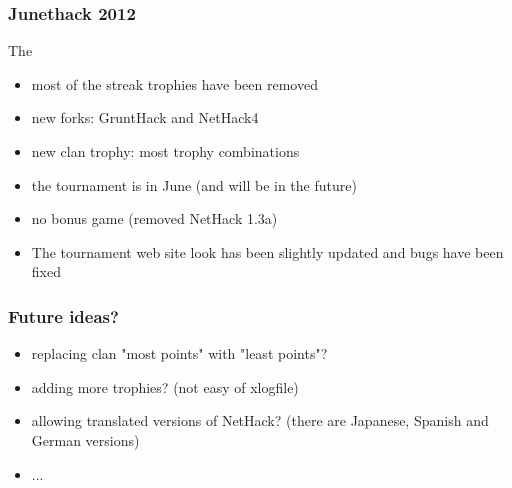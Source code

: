 \documentclass{beamer}
\begin{document}

\begin{frame}
\frametitle{Junethack 2012}
  The 
  \begin{itemize}[<+->]
    \item most of the streak trophies have been removed
    \item new forks: GruntHack and NetHack4
    \item new clan trophy: most trophy combinations
    \item the tournament is in June (and will be in the future)
    \item no bonus game (removed NetHack 1.3a)
    \item The tournament web site look has been slightly updated and bugs have been fixed
  \end{itemize}
\end{frame}

\begin{frame}
\frametitle{Future ideas?}
  \begin{itemize}[<+->]
    \item replacing clan "most points" with "least points"?
    \item adding more trophies? (not easy of xlogfile)
    \item allowing translated versions of NetHack? (there are Japanese, Spanish and
German versions)
    \item ...
  \end{itemize}
\end{frame}
\end{document}
